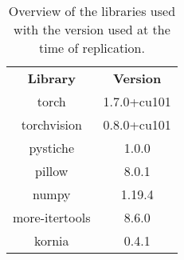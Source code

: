\begin{table*}[t]
	\renewcommand{\arraystretch}{1.3}
	\caption{Overview of the libraries used with the version used at the time of replication.}
	\label{tab:libraries}
	\centering
	\begin{tabular}{c|c}
		\hline
		\bfseries Library & \bfseries Version\\
		torch & 1.7.0+cu101\\
		torchvision &  0.8.0+cu101\\
		pystiche & 1.0.0\\
		pillow & 8.0.1\\
		numpy & 1.19.4\\
		more-itertools & 8.6.0\\
		kornia & 0.4.1 \\
		\hline
	\end{tabular}
\end{table*}